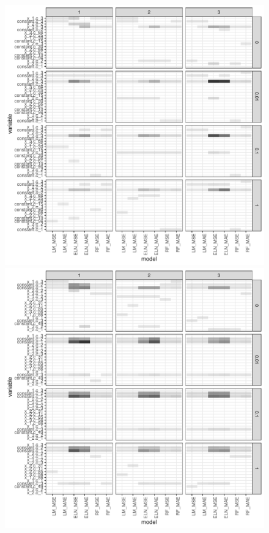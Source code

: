 \documentclass[a4paper, table]{article}
\begin{document}
\begin{figure}
\begin{center}
		\includegraphics{simulation_g2_vi_plot.pdf}
		\includegraphics{simulation_g3_vi_plot.pdf}
	\end{center}
\end{figure}
\end{document}

